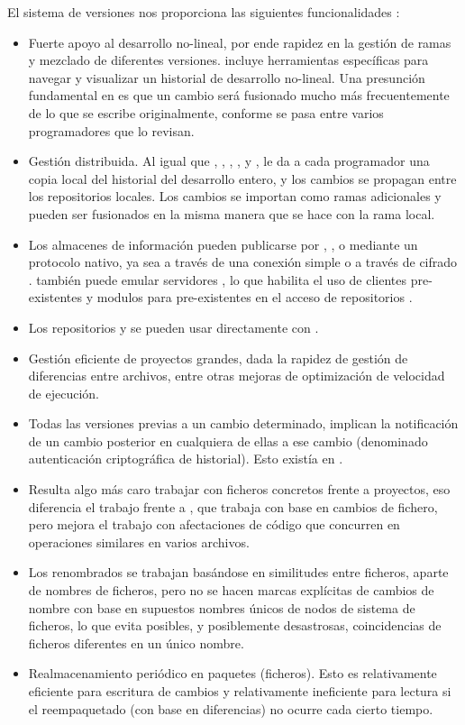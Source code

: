El sistema de versiones  nos proporciona las siguientes
funcionalidades \cite{wiki:GIT}:

\begin{itemize}
\item Fuerte apoyo al desarrollo no-lineal, por ende rapidez en la gestión de
  ramas y mezclado de diferentes versiones.  incluye herramientas específicas
  para navegar y visualizar un historial de desarrollo no-lineal. Una presunción
  fundamental en  es que un cambio será fusionado mucho más frecuentemente de
  lo que se escribe originalmente, conforme se pasa entre varios programadores
  que lo revisan.
\item Gestión distribuida. Al igual que , ,
  , ,  y ,
   le da a cada programador una copia local del historial del
  desarrollo entero, y los cambios se propagan entre los repositorios
  locales. Los cambios se importan como ramas adicionales y pueden ser
  fusionados en la misma manera que se hace con la rama local.
\item Los almacenes de información pueden publicarse por , ,  o
  mediante un protocolo nativo, ya sea a través de una conexión  simple o
  a través de cifrado .  también puede emular servidores , lo que
  habilita el uso de clientes  pre-existentes y modulos  para 
  pre-existentes en el acceso de repositorios .
\item Los repositorios  y  se pueden usar directamente con .
\item Gestión eficiente de proyectos grandes, dada la rapidez de gestión de
  diferencias entre archivos, entre otras mejoras de optimización de velocidad
  de ejecución.
\item Todas las versiones previas a un cambio determinado, implican la
  notificación de un cambio posterior en cualquiera de ellas a ese cambio
  (denominado autenticación criptográfica de historial). Esto existía en
  .
\item Resulta algo más caro trabajar con ficheros concretos frente a proyectos,
  eso diferencia el trabajo frente a , que trabaja con base en cambios de
  fichero, pero mejora el trabajo con afectaciones de código que concurren en
  operaciones similares en varios archivos.
\item Los renombrados se trabajan basándose en similitudes entre ficheros,
  aparte de nombres de ficheros, pero no se hacen marcas explícitas de cambios
  de nombre con base en supuestos nombres únicos de nodos de sistema de
  ficheros, lo que evita posibles, y posiblemente desastrosas, coincidencias de
  ficheros diferentes en un único nombre.
\item Realmacenamiento periódico en paquetes (ficheros). Esto es relativamente
  eficiente para escritura de cambios y relativamente ineficiente para lectura
  si el reempaquetado (con base en diferencias) no ocurre cada cierto tiempo.
\end{itemize}

